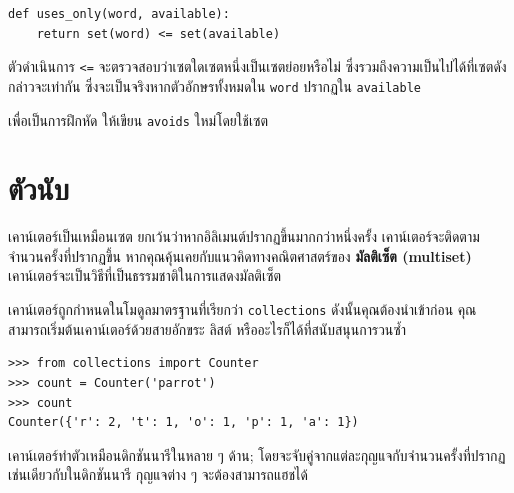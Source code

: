 \begin{verbatim}
def uses_only(word, available):
    return set(word) <= set(available)
\end{verbatim}
%

ตัวดำเนินการ \verb"<=" จะตรวจสอบว่าเซตใดเซตหนึ่งเป็นเซตย่อยหรือไม่ ซึ่งรวมถึงความเป็นไปได้ที่เซตดังกล่าวจะเท่ากัน 
ซึ่งจะเป็นจริงหากตัวอักษรทั้งหมดใน {\tt word} ปรากฏใน {\tt available}

เพื่อเป็นการฝึกหัด ให้เขียน \verb"avoids" ใหม่โดยใช้เซต


\section{ตัวนับ} %

เคาน์เตอร์เป็นเหมือนเซต ยกเว้นว่าหากอิลิเมนต์ปรากฏขึ้นมากกว่าหนึ่งครั้ง เคาน์เตอร์จะติดตามจำนวนครั้งที่ปรากฏขึ้น 
หากคุณคุ้นเคยกับแนวคิดทางคณิตศาสตร์ของ {\bf มัลติเซ็ต (multiset)} เคาน์เตอร์จะเป็นวิธีที่เป็นธรรมชาติในการแสดงมัลติเซ็ต


เคาน์เตอร์ถูกกำหนดในโมดูลมาตรฐานที่เรียกว่า {\tt collections} ดังนั้นคุณต้องนำเข้าก่อน คุณสามารถเริ่มต้นเคาน์เตอร์ด้วยสายอักขระ ลิสต์ หรืออะไรก็ได้ที่สนับสนุนการวนซ้ำ

\begin{verbatim}
>>> from collections import Counter
>>> count = Counter('parrot')
>>> count
Counter({'r': 2, 't': 1, 'o': 1, 'p': 1, 'a': 1})
\end{verbatim}

เคาน์เตอร์ทำตัวเหมือนดิกชันนารีในหลาย ๆ ด้าน; โดยจะจับคู่จากแต่ละกุญแจกับจำนวนครั้งที่ปรากฏ เช่นเดียวกับในดิกชันนารี 
กุญแจต่าง ๆ จะต้องสามารถแฮชได้


